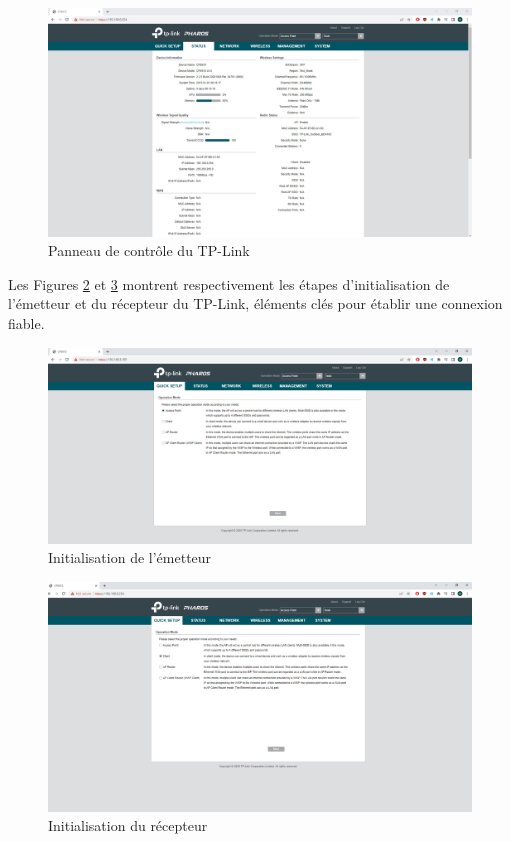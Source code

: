 \begin{figure}[H]
\centering
\includegraphics[width=15cm]{Images/tplink34.png}
\caption{Panneau de contrôle du TP-Link}
\label{Chap2.3.7}
\end{figure}

Les Figures \ref{Chap2.3.8} et \ref{Chap2.3.9} montrent respectivement les étapes d'initialisation de l'émetteur et du récepteur du TP-Link, éléments clés pour établir une connexion fiable.

\begin{figure}[H]
\centering
\includegraphics[width=15cm]{Images/tplink35.png}
\caption{Initialisation de l'émetteur}
\label{Chap2.3.8}
\end{figure}

\begin{figure}[H]
\centering
\includegraphics[width=15cm]{Images/tplink36.png}
\caption{Initialisation du récepteur}
\label{Chap2.3.9}
\end{figure}

